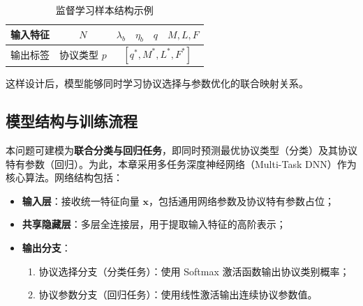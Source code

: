 \begin{table}[h]
	\centering
	\caption{监督学习样本结构示例}
	\begin{tabular}{c|c|c|c|c|c}
		\hline
		输入特征 & $N$ & $\lambda_b$ & $\eta_b$ & $q$ & $M,L,F$ \\ 
		\hline
		输出标签 & 协议类型 $p$ & \multicolumn{4}{c}{$[q^*, M^*, L^*, F^*]$} \\ 
		\hline
	\end{tabular}
\end{table}

这样设计后，模型能够同时学习协议选择与参数优化的联合映射关系。


\subsection{模型结构与训练流程}

本问题可建模为\textbf{联合分类与回归任务}，即同时预测最优协议类型（分类）及其协议特有参数（回归）。为此，本章采用多任务深度神经网络（Multi-Task DNN）作为核心算法。网络结构包括：
\begin{itemize}
	\item \textbf{输入层}：接收统一特征向量 $\mathbf{x}$，包括通用网络参数及协议特有参数占位；
	\item \textbf{共享隐藏层}：多层全连接层，用于提取输入特征的高阶表示；
	\item \textbf{输出分支}：
	\begin{enumerate}
		\item 协议选择分支（分类任务）：使用 Softmax 激活函数输出协议类别概率；
		\item 协议参数分支（回归任务）：使用线性激活输出连续协议参数值。
	\end{enumerate}
\end{itemize}

